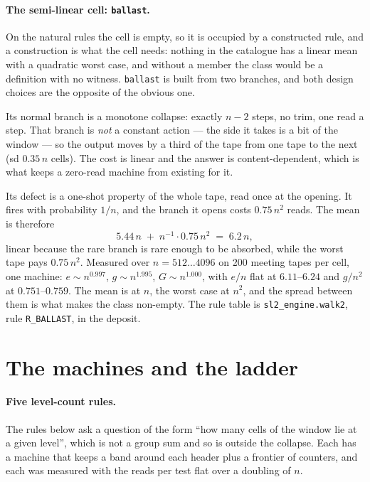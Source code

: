 \documentclass[11pt]{article}
\theoremstyle{remark}
\begin{document}
\paragraph{The semi-linear cell: \texttt{ballast}.} On the natural rules the cell is empty, so it is
occupied by a constructed rule, and a construction is what the cell needs: nothing in the catalogue
has a linear mean with a quadratic worst case, and without a member the class would be a definition
with no witness.  \texttt{ballast} is built from two branches, and both design choices are the
opposite of the obvious one.

Its normal branch is a monotone collapse: exactly $n-2$ steps, no trim, one read a step.  That branch
is \emph{not} a constant action --- the side it takes is a bit of the window --- so the output moves
by a third of the tape from one tape to the next (sd $0.35\,n$ cells).  The cost is linear and the
answer is content-dependent, which is what keeps a zero-read machine from existing for it.

Its defect is a one-shot property of the whole tape, read once at the opening.  It fires with
probability $1/n$, and the branch it opens costs $0.75\,n^{2}$ reads.  The mean is therefore
\[
5.44\,n \;+\; n^{-1}\cdot 0.75\,n^{2} \;=\; 6.2\,n ,
\]
linear because the rare branch is rare enough to be absorbed, while the worst tape pays
$0.75\,n^{2}$.  Measured over $n=512\ldots4096$ on 200 meeting tapes per cell, one machine:
$e\sim n^{0.997}$, $g\sim n^{1.995}$, $G\sim n^{1.000}$, with $e/n$ flat at $6.11$--$6.24$ and
$g/n^{2}$ at $0.751$--$0.759$.  The mean is at $n$, the worst case at $n^{2}$, and the spread
between them is what makes the class non-empty.  The rule table is \texttt{sl2\_engine.walk2}, rule
\texttt{R\_BALLAST}, in the deposit.

\section{The machines and the ladder}\label{sec:cost}

\paragraph{Five level-count rules.} The rules below ask a question of the form ``how many cells of
the window lie at a given level'', which is not a group sum and so is outside the collapse. Each has
a machine that keeps a band around each header plus a frontier of counters, and each was measured
with the reads per test flat over a doubling of $n$.
\end{document}
